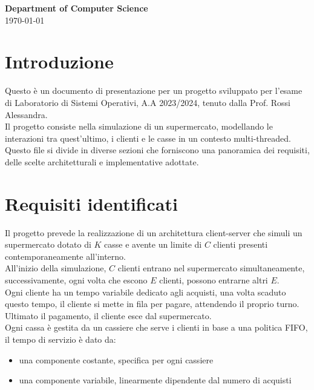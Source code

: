 \documentclass[a4paper, 12pt]{article}
\begin{document}
\begin{titlepage}
\vspace{2in}

\textbf{\large Department of Computer Science} \\

\today

\end{titlepage}

\newpage

\section{Introduzione}
Questo è un documento di presentazione per un progetto sviluppato per l'esame di Laboratorio di 
Sistemi Operativi, A.A 2023/2024, tenuto dalla Prof. Rossi Alessandra.  \\
Il progetto consiste nella simulazione di un supermercato, modellando le 
interazioni tra quest'ultimo, i clienti e le casse in un contesto multi-threaded. 
Questo file si divide in diverse sezioni che forniscono una panoramica dei 
requisiti, delle scelte architetturali e implementative adottate.
\section{Requisiti identificati}
Il progetto prevede la realizzazione di un architettura client-server che simuli 
un supermercato dotato di $K$ casse e avente un limite di $C$ clienti presenti 
contemporaneamente all'interno. \\
All'inizio della simulazione, $C$ clienti entrano nel supermercato 
simultaneamente, successivamente, ogni volta che escono $E$ clienti, possono 
entrarne altri $E$. \\
Ogni cliente ha un tempo variabile dedicato agli acquisti, una volta scaduto questo
tempo, il cliente si mette in fila per pagare, attendendo il proprio turno.
Ultimato il pagamento, il cliente esce dal supermercato. \\
Ogni cassa è gestita da un cassiere che serve i clienti in base a una politica FIFO,
il tempo di servizio è dato da:
\begin{itemize}[noitemsep,topsep=0pt,parsep=0pt,partopsep=0pt]
    \item una componente costante, specifica per ogni cassiere
    \item una componente variabile, linearmente dipendente dal numero di acquisti
\end{itemize}
\end{document}
